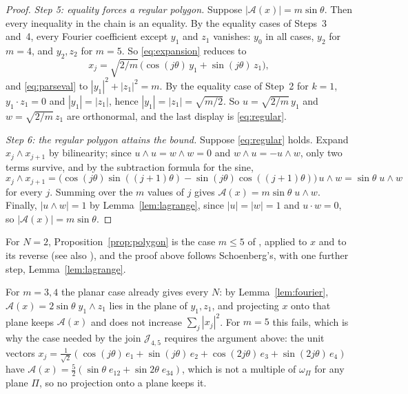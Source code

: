 \begin{proof}
  \emph{Step 5: equality forces a regular polygon.} Suppose
  $|\mathcal{A}(x)| = m\sin\theta$. Then every inequality in the chain is
  an equality. By the equality cases of Steps~3 and~4, every Fourier
  coefficient except $y_{1}$ and $z_{1}$ vanishes: $y_{0}$ in all cases,
  $y_{2}$ for $m = 4$, and $y_{2}, z_{2}$ for $m = 5$. So
  \eqref{eq:expansion} reduces to
  \[
    x_{j} = \sqrt{2/m}\,\bigl(\cos(j\theta)\, y_{1} + \sin(j\theta)\,
      z_{1}\bigr),
  \]
  and \eqref{eq:parseval} to $|y_{1}|^{2} + |z_{1}|^{2} = m$. By the
  equality case of Step~2 for $k = 1$, $y_{1} \cdot z_{1} = 0$ and
  $|y_{1}| = |z_{1}|$, hence $|y_{1}| = |z_{1}| = \sqrt{m/2}$. So
  $u = \sqrt{2/m}\, y_{1}$ and $w = \sqrt{2/m}\, z_{1}$ are orthonormal, and
  the last display is \eqref{eq:regular}.

  \emph{Step 6: the regular polygon attains the bound.} Suppose
  \eqref{eq:regular} holds. Expand $x_{j} \wedge x_{j+1}$ by bilinearity;
  since $u \wedge u = w \wedge w = 0$ and $w \wedge u = -u \wedge w$, only
  two terms survive, and by the subtraction formula for the sine,
  \[
    x_{j} \wedge x_{j+1}
      = \bigl(\cos(j\theta)\sin((j+1)\theta)
        - \sin(j\theta)\cos((j+1)\theta)\bigr)\, u \wedge w
      = \sin\theta\; u \wedge w
  \]
  for every $j$. Summing over the $m$ values of $j$ gives
  $\mathcal{A}(x) = m\sin\theta\; u \wedge w$. Finally, $|u \wedge w| = 1$
  by Lemma~\ref{lem:lagrange}, since $|u| = |w| = 1$ and $u \cdot w = 0$, so
  $|\mathcal{A}(x)| = m\sin\theta$.
\end{proof}

\begin{remark}
  \label{rem:planar}
  For $N = 2$, Proposition~\ref{prop:polygon} is the case $m \leq 5$ of
  \cite[Theorem~5]{schoenberg-1950}, applied to $x$ and to its reverse
  (see also \cite[Section~2.3, Theorem~12]{kazarinoff-1961}), and the proof
  above follows Schoenberg's, with one further step,
  Lemma~\ref{lem:lagrange}.
\end{remark}

\begin{remark}
  \label{rem:projection}
  For $m = 3, 4$ the planar case already gives every $N$: by
  Lemma~\ref{lem:fourier}, $\mathcal{A}(x) = 2\sin\theta\; y_{1} \wedge
  z_{1}$ lies in the plane of $y_{1}, z_{1}$, and projecting $x$ onto that
  plane keeps $\mathcal{A}(x)$ and does not increase $\sum_{j}
  |x_{j}|^{2}$. For $m = 5$ this fails, which is why the case needed by the
  join $\mathcal{J}_{4,5}$ requires the argument above: the unit vectors
  $x_{j} = \frac{1}{\sqrt{2}}(\cos(j\theta)\, e_{1} + \sin(j\theta)\, e_{2}
  + \cos(2j\theta)\, e_{3} + \sin(2j\theta)\, e_{4})$ have
  $\mathcal{A}(x) = \frac52(\sin\theta\; e_{12} + \sin 2\theta\; e_{34})$,
  which is not a multiple of $\omega_{\Pi}$ for any plane $\Pi$, so no
  projection onto a plane keeps it.
\end{remark}

